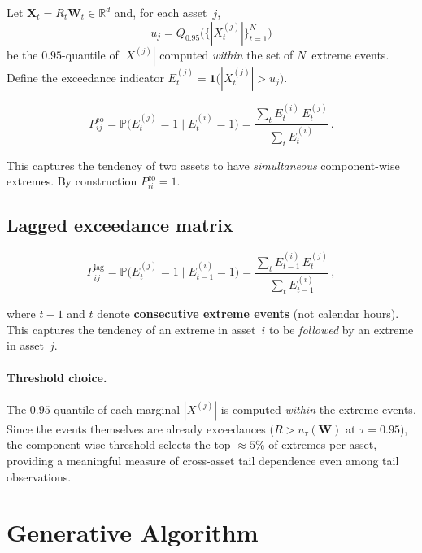 \documentclass[11pt,a4paper]{article}
\newcommand{\bW}{\boldsymbol{W}}
\newcommand{\bX}{\boldsymbol{X}}
\newcommand{\R}{\mathbb{R}}
\newcommand{\Prob}{\mathbb{P}}
\newcommand{\ind}{\mathbf{1}}
\begin{document}
Let $\bX_t = R_t \bW_t \in \R^d$ and, for each asset~$j$,
\[
  u_j = Q_{0.95}\!\bigl(\{|X_t^{(j)}|\}_{t=1}^N\bigr)
\]
be the $0.95$-quantile of $|X^{(j)}|$ computed \emph{within} the set of
$N$~extreme events.  Define the exceedance indicator
$E_t^{(j)} = \ind\!\bigl(|X_t^{(j)}| > u_j\bigr)$.

\begin{equation}\label{eq:contemp}
  P_{ij}^{\text{co}}
  = \Prob\!\bigl(E_t^{(j)} = 1 \;\big|\; E_t^{(i)} = 1\bigr)
  = \frac{\sum_{t} E_t^{(i)}\,E_t^{(j)}}{\sum_{t} E_t^{(i)}}\,.
\end{equation}

This captures the tendency of two assets to have \emph{simultaneous}
component-wise extremes.
By construction $P_{ii}^{\text{co}} = 1$.

\subsection{Lagged exceedance matrix}

\begin{equation}\label{eq:lagged}
  P_{ij}^{\text{lag}}
  = \Prob\!\bigl(E_t^{(j)} = 1 \;\big|\; E_{t-1}^{(i)} = 1\bigr)
  = \frac{\sum_{t} E_{t-1}^{(i)}\,E_t^{(j)}}{\sum_{t} E_{t-1}^{(i)}}\,,
\end{equation}

where $t{-}1$ and $t$ denote \textbf{consecutive extreme events}
(not calendar hours).
This captures the tendency of an extreme in asset~$i$
to be \emph{followed} by an extreme in asset~$j$.

\paragraph{Threshold choice.}
The $0.95$-quantile of each marginal $|X^{(j)}|$ is computed
\emph{within} the extreme events.  Since the events themselves
are already exceedances ($R > u_\tau(\bW)$ at $\tau = 0.95$), the
component-wise threshold selects the top $\approx 5\%$ of extremes
per asset, providing a meaningful measure of cross-asset tail dependence
even among tail observations.

\section{Generative Algorithm}\label{sec:algorithm}
\end{document}
